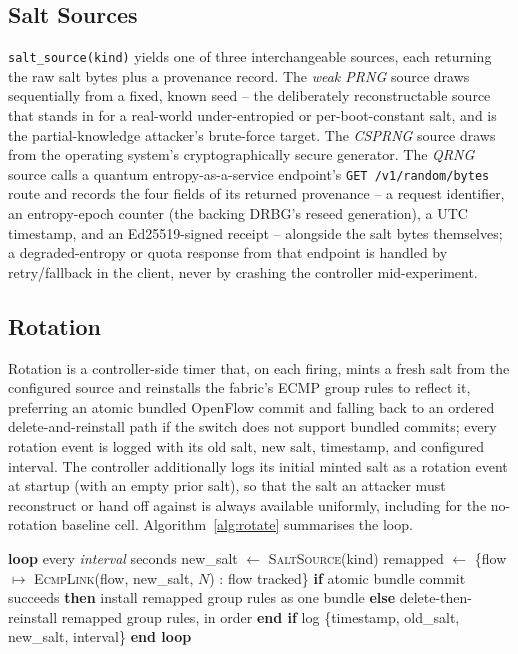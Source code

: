 \documentclass[conference]{IEEEtran}
\begin{document}
\subsection{Salt Sources}

\texttt{salt\_source(kind)} yields one of three interchangeable sources, each returning the raw salt bytes plus a
provenance record. The \emph{weak PRNG} source draws sequentially from a fixed, known seed -- the deliberately
reconstructable source that stands in for a real-world under-entropied or per-boot-constant salt, and is the
partial-knowledge attacker's brute-force target. The \emph{CSPRNG} source draws from the operating system's
cryptographically secure generator. The \emph{QRNG} source calls a quantum entropy-as-a-service endpoint's
\texttt{GET /v1/random/bytes} route and records the four fields of its returned provenance -- a request
identifier, an entropy-epoch counter (the backing DRBG's reseed generation), a UTC timestamp, and an
Ed25519-signed receipt -- alongside the salt bytes themselves; a degraded-entropy or quota response from that
endpoint is handled by retry/fallback in the client, never by crashing the controller mid-experiment.

\subsection{Rotation}

Rotation is a controller-side timer that, on each firing, mints a fresh salt from the configured source and
reinstalls the fabric's ECMP group rules to reflect it, preferring an atomic bundled OpenFlow commit and falling
back to an ordered delete-and-reinstall path if the switch does not support bundled commits; every rotation event
is logged with its old salt, new salt, timestamp, and configured interval. The controller additionally logs its
initial minted salt as a rotation event at startup (with an empty prior salt), so that the salt an attacker must
reconstruct or hand off against is always available uniformly, including for the no-rotation baseline cell.
Algorithm~\ref{alg:rotate} summarises the loop.

\begin{algorithm}[t]
\caption{Controller salt rotation}
\label{alg:rotate}
\begin{algorithmic}[1]
\STATE \textbf{loop} every \emph{interval} seconds
\STATE \quad new\_salt $\leftarrow$ \textsc{SaltSource}(kind)
\STATE \quad remapped $\leftarrow$ \{flow $\mapsto$ \textsc{EcmpLink}(flow, new\_salt, $N$) : flow tracked\}
\STATE \quad \textbf{if} atomic bundle commit succeeds \textbf{then}
\STATE \quad\quad install remapped group rules as one bundle
\STATE \quad \textbf{else}
\STATE \quad\quad delete-then-reinstall remapped group rules, in order
\STATE \quad \textbf{end if}
\STATE \quad log \{timestamp, old\_salt, new\_salt, interval\}
\STATE \textbf{end loop}
\end{algorithmic}
\end{algorithm}
\end{document}
